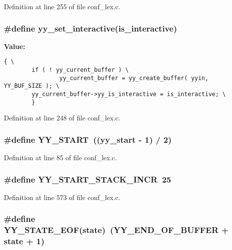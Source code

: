 Definition at line 255 of file conf\_\-lex.c.
\subsubsection{\setlength{\rightskip}{0pt plus 5cm}\#define yy\_\-set\_\-interactive(is\_\-interactive)}\label{conf__lex_8c_a25}


{\bf Value:}

\footnotesize\begin{verbatim}{ \
        if ( ! yy_current_buffer ) \
                yy_current_buffer = yy_create_buffer( yyin, YY_BUF_SIZE ); \
        yy_current_buffer->yy_is_interactive = is_interactive; \
        }
\end{verbatim}\normalsize 


Definition at line 248 of file conf\_\-lex.c.
\subsubsection{\setlength{\rightskip}{0pt plus 5cm}\#define YY\_\-START\ ((yy\_\-start - 1) / 2)}\label{conf__lex_8c_a8}




Definition at line 85 of file conf\_\-lex.c.
\subsubsection{\setlength{\rightskip}{0pt plus 5cm}\#define YY\_\-START\_\-STACK\_\-INCR\ 25}\label{conf__lex_8c_a56}




Definition at line 573 of file conf\_\-lex.c.
\subsubsection{\setlength{\rightskip}{0pt plus 5cm}\#define YY\_\-STATE\_\-EOF(state)\ (YY\_\-END\_\-OF\_\-BUFFER + state + 1)}\label{conf__lex_8c_a10}




